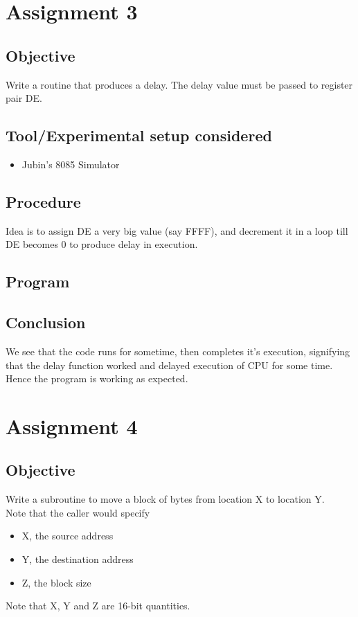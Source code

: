 \documentclass[a4paper]{article} %
\begin{document}
\section[Delay Procedure]{Assignment 3} %
    \subsection{Objective}
        Write a routine that produces a delay. The delay value must be passed to register pair DE.
    \subsection{Tool/Experimental setup considered}
        \begin{itemize}
            \item Jubin's 8085 Simulator
        \end{itemize}
    \subsection{Procedure}
        Idea is to assign DE a very big value (say FFFF), and decrement it in a loop till DE becomes 0 to produce delay in execution.
    \subsection{Program}
        
    \subsection{Conclusion}
        We see that the code runs for sometime, then completes it's execution, signifying that the delay function worked and delayed execution of CPU for some time.\\
        Hence the program is working as expected.
\newpage

\section[Move block of data from location X to location Y]{Assignment 4} %
    \subsection{Objective}
        Write a subroutine to move a block of bytes from location X to location Y.\\
        Note that the caller would specify
        \begin{itemize}
            \item X, the source address
            \item Y, the destination address
            \item Z, the block size
        \end{itemize}
        Note that X, Y and Z are 16-bit quantities.
\end{document}
